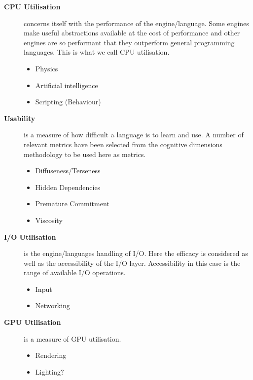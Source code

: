 \begin{description}
    \item[\textbf{CPU Utilisation}] concerns itself with the performance of the engine/language. Some engines make useful abstractions available at the cost of performance and other engines are so performant that they outperform general programming languages. This is what we call \ac{CPU} utilisation.
    \begin{itemize}
        \item Physics
        \item Artificial intelligence
        \item Scripting (Behaviour)
    \end{itemize}
    \item[\textbf{Usability}] is a measure of how difficult a language is to learn and use. A number of relevant metrics have been selected from the cognitive dimensions methodology to be used here as metrics.
    \begin{itemize}
        \item Diffuseness/Terseness
        \item Hidden Dependencies
        \item Premature Commitment
        \item Viscosity 
    \end{itemize}
    \item[\textbf{I/O Utilisation}] is the engine/languages handling of \ac{I/O}. Here the efficacy is considered as well as the accessibility of the \ac{I/O} layer. Accessibility in this case is the range of available \ac{I/O} operations.
    \begin{itemize}
        \item Input
        \item Networking
    \end{itemize}
    \item[\textbf{GPU Utilisation}] is a measure of \ac{GPU} utilisation. 
    \begin{itemize}
        \item Rendering
        \item Lighting?
    \end{itemize}
\end{description}

